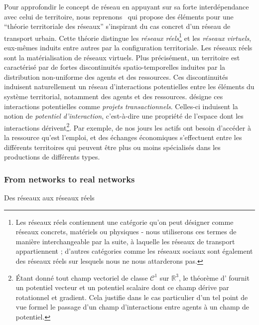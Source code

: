 {Pour approfondir le concept de réseau en appuyant sur sa forte interdépendance avec celui de territoire, nous reprenons~\cite{dupuy1987vers} qui propose des éléments pour une ``théorie territoriale des réseaux'' s'inspirant du cas concret d'un réseau de transport urbain. Cette théorie distingue les \emph{réseaux réels}\footnote{Les réseaux réels contiennent une catégorie qu'on peut désigner comme réseaux concrets, matériels ou physiques - nous utiliserons ces termes de manière interchangeable par la suite, à laquelle les réseaux de transport appartiennent ; d'autres catégories comme les réseaux sociaux sont également des réseaux réels sur lesquels nous ne nous attarderons pas.} et les \emph{réseaux virtuels}, eux-mêmes induits entre autres par la configuration territoriale. Les réseaux réels sont la matérialisation de réseaux virtuels. Plus précisément, un territoire est caractérisé par de fortes discontinuités spatio-temporelles induites par la distribution non-uniforme des agents et des ressources. Ces discontinuités induisent naturellement un réseau d'interactions potentielles entre les éléments du système territorial, notamment des agents et des ressources. \cite{dupuy1987vers} désigne ces interactions potentielles comme \emph{projets transactionnels}. Celles-ci induisent la notion de \emph{potentiel d'interaction}, c'est-à-dire une propriété de l'espace dont les interactions dérivent\footnote{Étant donné tout champ vectoriel de classe $\mathcal{C}^1$ sur $\mathbb{R}^3$, le théorème d' fournit un potentiel vecteur et un potentiel scalaire dont ce champ dérive par rotationnel et gradient. Cela justifie dans le cas particulier d'un tel point de vue formel le passage d'un champ d'interactions entre agents à un champ de potentiel.}. Par exemple, de nos jours les actifs ont besoin d'accéder à la ressource qu'est l'emploi, et des échanges économiques s'effectuent entre les différents territoires qui peuvent être plus ou moins spécialisés dans les productions de différents types.
}



\subsubsection{From networks to real networks}{Des réseaux aux réseaux réels}




